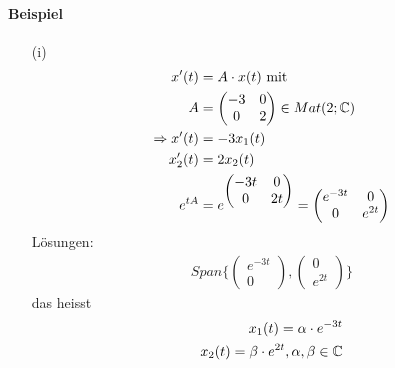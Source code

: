 \paragraph{Beispiel}
\begin{itemize}
\item[(i)]
\begin{align}
x'(t) &= A \cdot x(t) \text{ mit} \\
A &= \begin{pmatrix} -3 & 0 \\ 0 & 2 \end{pmatrix} \in Mat(2; \mathbb{C}) \\
\Rightarrow x'(t) &= -3x_1(t) \\
x_2'(t) &= 2x_2(t) \\
e^{t A} &= e^{\begin{pmatrix} -3t & 0 \\ 0 & 2t \end{pmatrix}} = \begin{pmatrix} e^{-3t} & 0 \\ 0 & e^{2t} \end{pmatrix}
\end{align}
Lösungen:
\begin{align}
Span\{ \begin{pmatrix} e^{-3t} \\ 0 \end{pmatrix}, \begin{pmatrix} 0 \\ e^{2t} \end{pmatrix}\}
\end{align}
das heisst
\begin{align}
x_1(t) = \alpha \cdot e^{-3t} \\
x_2(t) = \beta \cdot e^{2t}, \alpha, \beta \in \mathbb{C}
\end{align}


\end{itemize}

